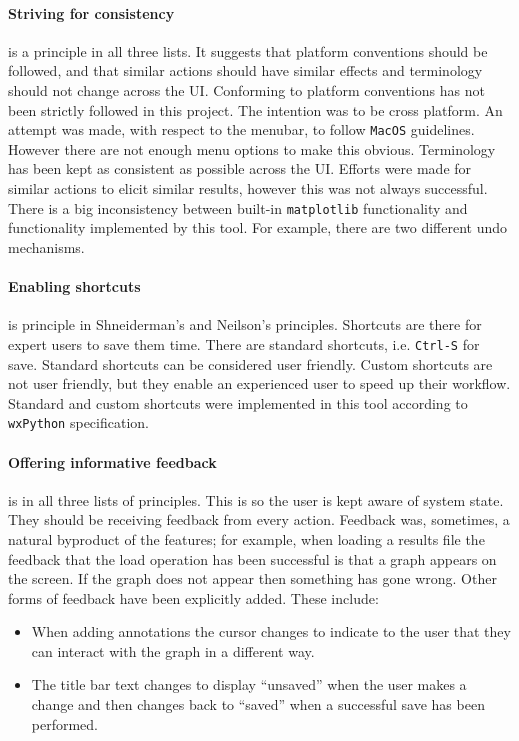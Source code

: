 \paragraph*{Striving for consistency} is a principle in all three lists.  It suggests that platform conventions should be followed, and that similar actions should have similar effects and terminology should not change across the \ac{UI}.  Conforming to platform conventions has not been strictly followed in this project.  The intention was to be cross platform.  An attempt was made, with respect to the menubar, to follow \texttt{MacOS} guidelines.  However there are not enough menu options to make this obvious.  Terminology has been kept as consistent as possible across the \ac{UI}.  Efforts were made for similar actions to elicit similar results, however this was not always successful.  There is a big inconsistency between built-in \texttt{matplotlib} functionality and functionality implemented by this tool.  For example, there are two different undo mechanisms.

\paragraph*{Enabling shortcuts} is principle in Shneiderman's and Neilson's principles.  Shortcuts are there for expert users to save them time.  There are standard shortcuts, i.e. \texttt{Ctrl-S} for save.  Standard shortcuts can be considered user friendly.  Custom shortcuts are not user friendly, but they enable an experienced user to speed up their workflow.  Standard and custom shortcuts were implemented in this tool according to \texttt{wxPython} specification.

\paragraph*{Offering informative feedback} is in all three lists of principles.  This is so the user is kept aware of system state.  They should be receiving feedback from every action. Feedback was, sometimes, a natural byproduct of the features; for example, when loading a results file the feedback that the load operation has been successful is that a graph appears on the screen. If the graph does not appear then something has gone wrong.  Other forms of feedback have been explicitly added.  These include:
\begin{itemize}
\item When adding annotations the cursor changes to indicate to the user that they can interact with the graph in a different way.
\item The title bar text changes to display ``unsaved'' when the user makes a change and then changes back to ``saved'' when a successful save has been performed.
\end{itemize}

